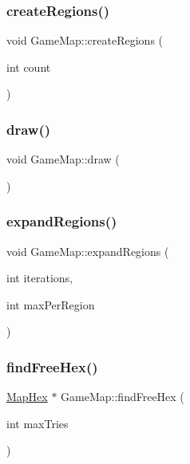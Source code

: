 \subsubsection{\texorpdfstring{create\+Regions()}{createRegions()}}
{\footnotesize\ttfamily void Game\+Map\+::create\+Regions (\begin{DoxyParamCaption}\item[{int}]{count }\end{DoxyParamCaption})\hspace{0.3cm}{\ttfamily [private]}}

\mbox{\label{class_game_map_ae560711cdd8957dfe1d015cbd082b5d9}} 
\subsubsection{\texorpdfstring{draw()}{draw()}}
{\footnotesize\ttfamily void Game\+Map\+::draw (\begin{DoxyParamCaption}{ }\end{DoxyParamCaption})}

\mbox{\label{class_game_map_a1dd3adda9c0f19a20dc6df3786746868}} 
\subsubsection{\texorpdfstring{expand\+Regions()}{expandRegions()}}
{\footnotesize\ttfamily void Game\+Map\+::expand\+Regions (\begin{DoxyParamCaption}\item[{int}]{iterations,  }\item[{int}]{max\+Per\+Region }\end{DoxyParamCaption})\hspace{0.3cm}{\ttfamily [private]}}

\mbox{\label{class_game_map_a701f80838169a259bdbb9a157a1bb85d}} 
\subsubsection{\texorpdfstring{find\+Free\+Hex()}{findFreeHex()}}
{\footnotesize\ttfamily \hyperlink{class_map_hex}{Map\+Hex} $\ast$ Game\+Map\+::find\+Free\+Hex (\begin{DoxyParamCaption}\item[{int}]{max\+Tries }\end{DoxyParamCaption})\hspace{0.3cm}{\ttfamily [private]}}


